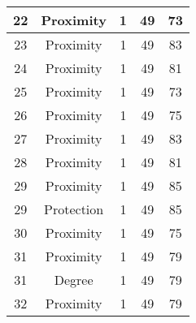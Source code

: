 \documentclass[results.tex]{subfiles}
\begin{document}
\begin{center}
\begin{tabular}{| c || c | c | c | c |}
            \hline
            22                      & Proximity                    & 1                      & 49                      & 73                   \\
            \hline
            23                      & Proximity                    & 1                      & 49                      & 83                   \\
            \hline
            24                      & Proximity                    & 1                      & 49                      & 81                   \\
            \hline
            25                      & Proximity                    & 1                      & 49                      & 73                   \\
            \hline
            26                      & Proximity                    & 1                      & 49                      & 75                   \\
            \hline
            27                      & Proximity                    & 1                      & 49                      & 83                   \\
            \hline
            28                      & Proximity                    & 1                      & 49                      & 81                   \\
            \hline
            29                      & Proximity                    & 1                      & 49                      & 85                   \\
            \hline
            29                      & Protection                   & 1                      & 49                      & 85                   \\
            \hline
            30                      & Proximity                    & 1                      & 49                      & 75                   \\
            \hline
            31                      & Proximity                    & 1                      & 49                      & 79                   \\
            \hline
            31                      & Degree                       & 1                      & 49                      & 79                   \\
            \hline
            32                      & Proximity                    & 1                      & 49                      & 79                   \\

\end{tabular}
\end{center}
\end{document}
